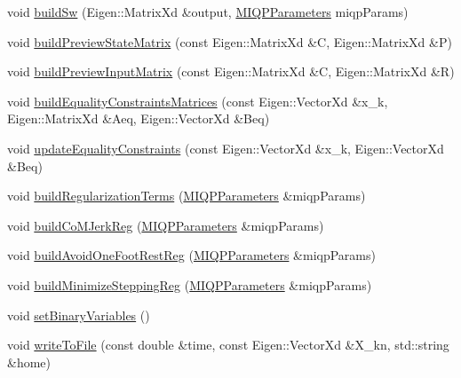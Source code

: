 \begin{DoxyCompactItemize}
\item 
void \hyperlink{classMIQPController_a3085bba3c89e6ed0265e8e229590e7f1}{build\-Sw} (\-Eigen\-::\-Matrix\-Xd \&output, \hyperlink{structMIQPParameters}{\-M\-I\-Q\-P\-Parameters} miqp\-Params)
\item 
void \hyperlink{classMIQPController_ad9a2e7d2c658937c847097f83d3408e3}{build\-Preview\-State\-Matrix} (const \-Eigen\-::\-Matrix\-Xd \&\-C, \-Eigen\-::\-Matrix\-Xd \&\-P)
\item 
void \hyperlink{classMIQPController_a9e4f007d1b6b7f68582aebbc09cf0813}{build\-Preview\-Input\-Matrix} (const \-Eigen\-::\-Matrix\-Xd \&\-C, \-Eigen\-::\-Matrix\-Xd \&\-R)
\item 
void \hyperlink{classMIQPController_a870c7d3c0e5fcfd46f7bb95924007082}{build\-Equality\-Constraints\-Matrices} (const \-Eigen\-::\-Vector\-Xd \&x\-\_\-k, \-Eigen\-::\-Matrix\-Xd \&\-Aeq, \-Eigen\-::\-Vector\-Xd \&\-Beq)
\item 
void \hyperlink{classMIQPController_a4c3f665528fae6c051160456692372ee}{update\-Equality\-Constraints} (const \-Eigen\-::\-Vector\-Xd \&x\-\_\-k, \-Eigen\-::\-Vector\-Xd \&\-Beq)
\item 
void \hyperlink{classMIQPController_a973c28f80d04db7cdbdced07e1eeda16}{build\-Regularization\-Terms} (\hyperlink{structMIQPParameters}{\-M\-I\-Q\-P\-Parameters} \&miqp\-Params)
\item 
void \hyperlink{classMIQPController_ac458316007d11e4b592cfb2e227bad69}{build\-Co\-M\-Jerk\-Reg} (\hyperlink{structMIQPParameters}{\-M\-I\-Q\-P\-Parameters} \&miqp\-Params)
\item 
void \hyperlink{classMIQPController_ad18d82e49c5508dc0239c21a85809131}{build\-Avoid\-One\-Foot\-Rest\-Reg} (\hyperlink{structMIQPParameters}{\-M\-I\-Q\-P\-Parameters} \&miqp\-Params)
\item 
void \hyperlink{classMIQPController_af721e438de3208adc893abe78551a0cb}{build\-Minimize\-Stepping\-Reg} (\hyperlink{structMIQPParameters}{\-M\-I\-Q\-P\-Parameters} \&miqp\-Params)
\item 
void \hyperlink{classMIQPController_afce6feca593352323e052b6c993cbf69}{set\-Binary\-Variables} ()
\item 
void \hyperlink{classMIQPController_a014cab392ddec6085df74f2590af4791}{write\-To\-File} (const double \&time, const \-Eigen\-::\-Vector\-Xd \&\-X\-\_\-kn, std\-::string \&home)
\end{DoxyCompactItemize}
